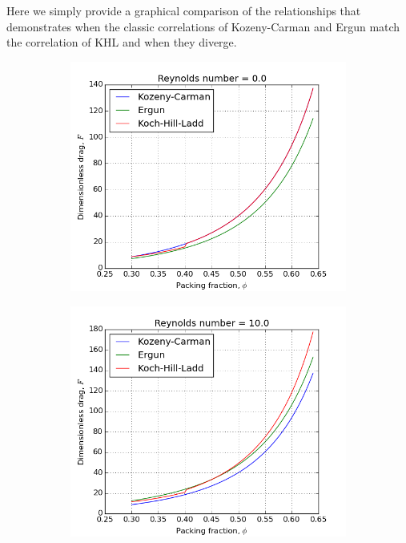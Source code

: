 Here we simply provide a graphical comparison of the relationships that demonstrates when the classic correlations of Kozeny-Carman and Ergun match the correlation of KHL and when they diverge.
\begin{figure}[!ht]
	\centering
	\begin{subfigure}[b]{0.45\textwidth}
		\centering
		\includegraphics[width=\textwidth]{chapters/figures/pressure-drop-correlations/Re0.png}
	\end{subfigure}
	\begin{subfigure}[b]{0.45\textwidth}
		\centering
		\includegraphics[width=\textwidth]{chapters/figures/pressure-drop-correlations/Re10.png}
	\end{subfigure}
	

\end{figure}
